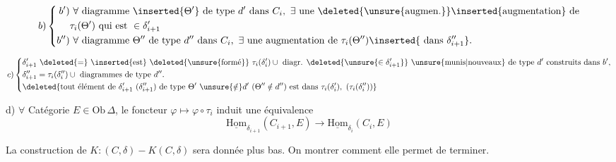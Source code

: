 \[
b)\left\{\begin{aligned}
b')&\ \forall\text{ diagramme }\inserted{\Theta'}\text{ de type }d'\text{ dans } C_i,\ \exists\text{ une }\deleted{\unsure{\text{augmen.}}}\inserted{\text{augmentation}}\text{ de}\\
&\tau_i(\Theta')\text{ qui est }\in\delta'_{i+1}\\
b'')&\ \forall\text{ diagramme }\Theta''\text{ de type }d''\text{ dans }C_i,\ \exists\text{ une augmentation de }\tau_i(\Theta'')\inserted{\text{ dans }\delta''_{i+1}}.
\end{aligned}\right.
\]

\[
c)\left\{\begin{aligned}
&\delta'_{i+1}\ \deleted{=}\ \inserted{\text{est}}\ \deleted{\unsure{\text{formé}}}\ \tau_i(\delta'_i)\cup\text{ diagr. }\deleted{\unsure{\in\delta'_{i+1}}}\text{ }\unsure{\text{munis}|\text{nouveaux}}\text{ de type }d'\text{ construits dans }b',\\
&\delta''_{i+1}=\tau_i(\delta''_i)\cup\text{ diagrammes de type }d''.\\
&\deleted{\text{tout élément de }\delta'_{i+1}\ (\delta''_{i+1})\text{ de type }\Theta'\ \unsure{\notin}d'\ (\Theta''\notin d'')\text{ est dans }\tau_i(\delta'_i),\ (\tau_i(\delta''_i))}
\end{aligned}\right.
\]


d) $\forall$ Catégorie $E\in\mathrm{Ob}\,\Delta$, le foncteur $\varphi\longmapsto\varphi\circ\tau_i$ induit une équivalence
\[
\underline{\mathrm{Hom}}_{\delta_{i+1}}(C_{i+1},E)\longrightarrow\underline{\mathrm{Hom}}_{\delta_i}(C_i,E)
\]

 La construction de $K:(C,\delta)- K(C,\delta)$ sera donnée plus bas. On   montrer comment elle permet de terminer.

